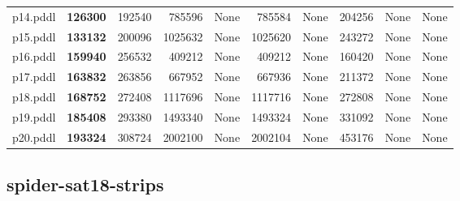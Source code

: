 \documentclass{article}
\begin{document}
\begin{tabular}{@{}lrrrrrrrrr@{}}
p14.pddl & \textbf{126300} & 192540 & 785596 & \multicolumn{1}{|l|}{None} & 785584 & \multicolumn{1}{|l|}{None} & 204256 & \multicolumn{1}{|l|}{None} & \multicolumn{1}{|l|}{None} \\
p15.pddl & \textbf{133132} & 200096 & 1025632 & \multicolumn{1}{|l|}{None} & 1025620 & \multicolumn{1}{|l|}{None} & 243272 & \multicolumn{1}{|l|}{None} & \multicolumn{1}{|l|}{None} \\
p16.pddl & \textbf{159940} & 256532 & 409212 & \multicolumn{1}{|l|}{None} & 409212 & \multicolumn{1}{|l|}{None} & 160420 & \multicolumn{1}{|l|}{None} & \multicolumn{1}{|l|}{None} \\
p17.pddl & \textbf{163832} & 263856 & 667952 & \multicolumn{1}{|l|}{None} & 667936 & \multicolumn{1}{|l|}{None} & 211372 & \multicolumn{1}{|l|}{None} & \multicolumn{1}{|l|}{None} \\
p18.pddl & \textbf{168752} & 272408 & 1117696 & \multicolumn{1}{|l|}{None} & 1117716 & \multicolumn{1}{|l|}{None} & 272808 & \multicolumn{1}{|l|}{None} & \multicolumn{1}{|l|}{None} \\
p19.pddl & \textbf{185408} & 293380 & 1493340 & \multicolumn{1}{|l|}{None} & 1493324 & \multicolumn{1}{|l|}{None} & 331092 & \multicolumn{1}{|l|}{None} & \multicolumn{1}{|l|}{None} \\
p20.pddl & \textbf{193324} & 308724 & 2002100 & \multicolumn{1}{|l|}{None} & 2002104 & \multicolumn{1}{|l|}{None} & 453176 & \multicolumn{1}{|l|}{None} & \multicolumn{1}{|l|}{None} \\
\end{tabular}

\hypertarget{search_start_memory-spider-sat18-strips}{}
\subsection*{spider-sat18-strips}
\end{document}
